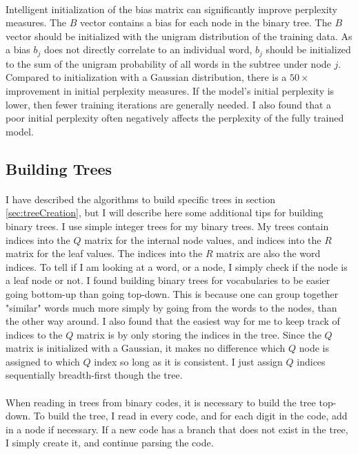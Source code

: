 \documentclass[12pt]{ociamthesis}  %
\begin{document}
\paragraph{}
Intelligent initialization of the bias matrix can significantly improve perplexity measures. The $B$ vector contains a bias for each node in the binary tree.  The $B$ vector should be initialized with the unigram distribution of the training data. As a bias $b_j$ does not directly correlate to an individual word, $b_j$ should be initialized to the sum of the unigram probability of all words in the subtree under node $j$.  Compared to initialization with a Gaussian distribution, there is a $50\times$ improvement in initial perplexity measures. If the model's initial perplexity is lower, then fewer training iterations are generally needed. I also found that a poor initial perplexity often negatively affects the perplexity of the fully trained model.

\subsection{Building Trees}
\paragraph{}
I have described the algorithms to build specific trees in section \ref{sec:treeCreation}, but I will describe here some additional tips for building binary trees. I use simple integer trees for my binary trees. My trees contain indices into the $Q$ matrix for the internal node values, and indices into the $R$ matrix for the leaf values. The indices into the $R$ matrix are also the word indices. To tell if I am looking at a word, or a node, I simply check if the node is a leaf node or not.  I found building binary trees for vocabularies to be easier going bottom-up than going top-down. This is because one can group together "similar" words much more simply by going from the words to the nodes, than the other way around. I also found that the easiest way for me to keep track of indices to the $Q$ matrix is by only storing the indices in the tree. Since the $Q$ matrix is initialized with a Gaussian, it makes no difference which $Q$ node is assigned to which $Q$ index so long as it is consistent. I just assign $Q$ indices sequentially breadth-first though the tree. 
\paragraph{}
When reading in trees from binary codes, it is necessary to build the tree top-down. To build the tree, I read in every code, and for each digit in the code, add in a node if necessary. If a new code has a branch that does not exist in the tree, I simply create it, and continue parsing the code.
\end{document}
